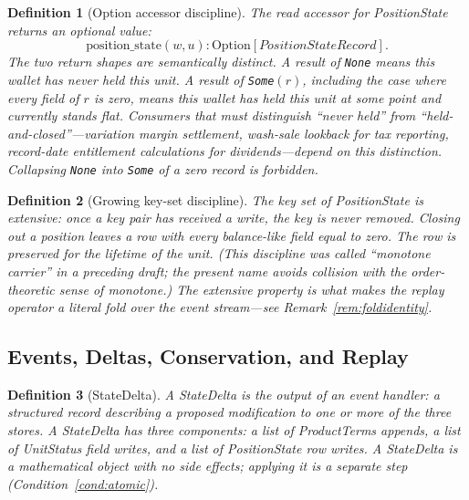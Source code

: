 \documentclass[11pt,a4paper]{article}
\newtheorem{definition}{Definition}[section]
\begin{document}
\begin{definition}[Option accessor discipline]
\label{def:optionaccessor}
The read accessor for \textit{PositionState} returns an optional value:
\[
\mathrm{position\_state}(w, u) : \mathrm{Option}[\textit{PositionStateRecord}].
\]
The two return shapes are semantically distinct. A result of \texttt{None} means \emph{this wallet has never held this unit}. A result of \texttt{Some}$(r)$, including the case where every field of $r$ is zero, means \emph{this wallet has held this unit at some point and currently stands flat}. Consumers that must distinguish ``never held'' from ``held-and-closed''---variation margin settlement, wash-sale lookback for tax reporting, record-date entitlement calculations for dividends---depend on this distinction. Collapsing \texttt{None} into \texttt{Some} of a zero record is forbidden.
\end{definition}

\begin{definition}[Growing key-set discipline]
\label{def:growingkeyset}
The key set of \textit{PositionState} is \emph{extensive}: once a key pair has received a write, the key is never removed. Closing out a position leaves a row with every balance-like field equal to zero. The row is preserved for the lifetime of the unit. (This discipline was called ``monotone carrier'' in a preceding draft; the present name avoids collision with the order-theoretic sense of monotone.) The extensive property is what makes the replay operator a literal fold over the event stream---see Remark~\ref{rem:foldidentity}.
\end{definition}

\subsection{Events, Deltas, Conservation, and Replay}

\begin{definition}[StateDelta]
\label{def:statedelta}
A \emph{StateDelta} is the output of an event handler: a structured record describing a proposed modification to one or more of the three stores. A \textit{StateDelta} has three components: a list of \textit{ProductTerms} appends, a list of \textit{UnitStatus} field writes, and a list of \textit{PositionState} row writes. A \textit{StateDelta} is a mathematical object with no side effects; applying it is a separate step (Condition~\ref{cond:atomic}).
\end{definition}
\end{document}
